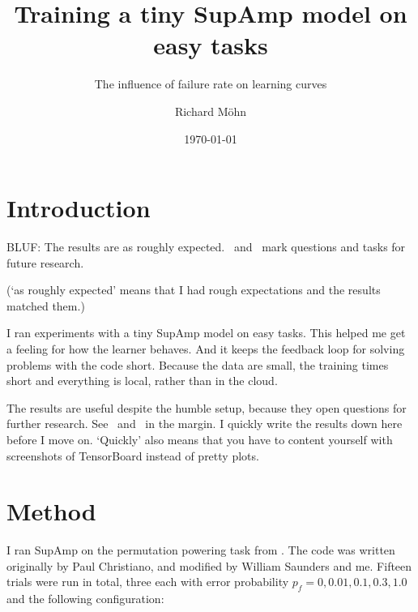 \documentclass{farlamp}
\title{Training a tiny SupAmp model on easy tasks}
\subtitle{The influence of failure rate on learning curves}
\author{Richard Möhn}
\date{\today}
\begin{document}
\maketitle
\tableofcontents

\section{Introduction}

BLUF: The results are as roughly expected. \OQsymbol\ and \TODO\ mark questions
and tasks for future research.

(‘as roughly expected’ means that I had rough expectations and the results
matched them.)

I ran experiments with a tiny SupAmp model on easy tasks. This helped me get a
feeling for how the learner behaves. And it keeps the feedback loop for solving
problems with the code short. Because the data are small, the training times
short and everything is local, rather than in the cloud.

The results are useful despite the humble setup, because they open questions for
further research. See \OQsymbol\ and \TODOsymbol\ in the margin. I quickly write
the results down here before I move on. ‘Quickly’ also means that you have to
content yourself with screenshots of TensorBoard instead of pretty plots.




\section{Method}

I ran SupAmp on the permutation powering task from \cite{CSASupAmp}. The code
was written originally by Paul Christiano, and modified by William Saunders and
me. Fifteen trials were run in total, three each with error probability $p_f =
0, 0.01, 0.1, 0.3, 1.0$ and the following configuration:
\end{document}
